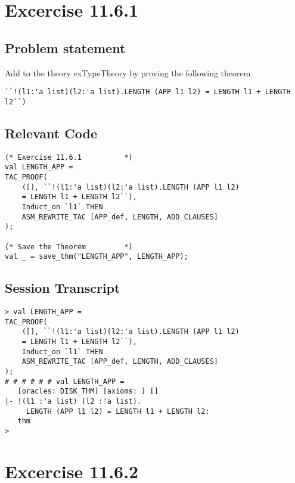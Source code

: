 \documentclass{report}
\begin{document}
\chapter{Excercise 11.6.1}
\label{cha:11-6-1}

\section{Problem statement}
\label{problem-statement-11-6-1}
Add to the theory exTypeTheory by proving the following theorem
\begin{lstlisting}[frame=tblr]
 ``!(l1:'a list)(l2:'a list).LENGTH (APP l1 l2) = LENGTH l1 + LENGTH l2``)
\end{lstlisting}

\section{Relevant Code}
\label{rel-code-11-6-1}
\begin{lstlisting}[frame=TBlr]
(* Exercise 11.6.1			*)
val LENGTH_APP =
TAC_PROOF(
	([], ``!(l1:'a list)(l2:'a list).LENGTH (APP l1 l2)
	= LENGTH l1 + LENGTH l2``),
	Induct_on `l1` THEN
	ASM_REWRITE_TAC [APP_def, LENGTH, ADD_CLAUSES]
);

(* Save the Theorem			*)
val _ = save_thm("LENGTH_APP", LENGTH_APP);

\end{lstlisting}

\section{Session Transcript}
\label{trans-11-6-1}
\begin{session}
  \begin{scriptsize}
\begin{verbatim}
> val LENGTH_APP =
TAC_PROOF(
	([], ``!(l1:'a list)(l2:'a list).LENGTH (APP l1 l2)
	= LENGTH l1 + LENGTH l2``),
	Induct_on `l1` THEN
	ASM_REWRITE_TAC [APP_def, LENGTH, ADD_CLAUSES]
);
# # # # # # val LENGTH_APP =
   [oracles: DISK_THM] [axioms: ] []
|- !(l1 :'a list) (l2 :'a list).
     LENGTH (APP l1 l2) = LENGTH l1 + LENGTH l2:
   thm
> 

\end{verbatim}
  \end{scriptsize}
\end{session}

\chapter{Excercise 11.6.2}
\label{cha:11-6-2}
\end{document}
